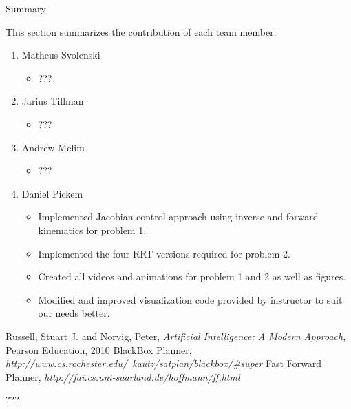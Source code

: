 \documentclass[12pt]{article}
\begin{document}
\newpage
\begin{center}
\Huge{Summary} 
\end{center}
This section summarizes the contribution of each team member. 

\begin{enumerate}
  \item Matheus Svolenski
    \begin{itemize}
     \item ???
    \end{itemize}

  \item Jarius Tillman
   \begin{itemize}
     \item ???
    \end{itemize}
  \item Andrew Melim
    \begin{itemize}
     \item ???
    \end{itemize}

  \item Daniel Pickem
    \begin{itemize}
     \item Implemented Jacobian control approach using inverse and forward kinematics for problem 1.
     \item Implemented the four RRT versions required for problem 2.
     \item Created all videos and animations for problem 1 and 2 as well as figures.
     \item Modified and improved visualization code provided by instructor to suit our needs better. 
    \end{itemize}
\end{enumerate}

\begin{thebibliography}{50}
   Russell, Stuart J. and Norvig, Peter, \textsl{Artificial Intelligence: A Modern Approach}, Pearson Education, 2010
   BlackBox Planner, \textsl{http://www.cs.rochester.edu/~kautz/satplan/blackbox/\#super}
   Fast Forward Planner, \textsl{http://fai.cs.uni-saarland.de/hoffmann/ff.html}
\end{thebibliography}

\newpage
\begin{appendix}
???
\end{appendix}

\newpage
\end{document}
